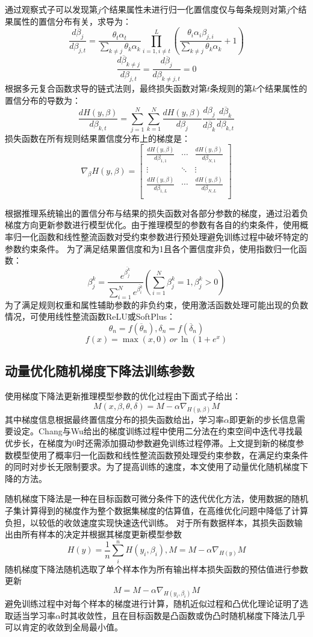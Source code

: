 \documentclass{cjc}
\begin{document}
通过观察式子可以发现第$j$个结果属性未进行归一化置信度仅与每条规则对第$j$个结果属性的置信分布有关，求导为：
$$\frac{d\overline{\beta}_j}{d\beta_{j,t}}=\frac{\theta_t\alpha_t}{\sum_{k\neq j}\theta_k\alpha_k}\prod_{i=1,i\neq t}^L(\frac{\theta_i\alpha_i\beta_{j,i}}{\sum_{k\neq j}\theta_k\alpha_k}+1)$$
$$\frac{d\overline{\beta}_{k\neq j}}{d\beta_{j,t}}=\frac{d\overline{\beta}_j}{d\beta_{k\neq j,t}}=0$$
根据多元复合函数求导的链式法则，最终损失函数对第$t$条规则的第$k$个结果属性的置信分布的导数为：
$$\frac{dH(y,\beta)}{d\beta_{k,t}}=\sum_{j=1}^N\sum_{k=1}^N\frac{dH(y,\beta)}{d\beta_j}\frac{d\beta_j}{d\overline{\beta}_k}\frac{d\overline{\beta}_k}{d\beta_{k,t}}$$
损失函数在所有规则结果置信度分布上的梯度是：
$$\nabla_{\beta}H(y,\beta)=
\left[
\begin{matrix}
\frac{dH(y,\beta)}{d\beta_{1,1}} & \cdots & 
\frac{dH(y,\beta)}{d\beta_{N,1}}\\
\vdots & \ddots & \vdots\\
\frac{dH(y,\beta)}{d\beta_{1,L}} & \cdots & 
\frac{dH(y,\beta)}{d\beta_{N,L}}\\
\end{matrix}
\right]$$

根据推理系统输出的置信分布与结果的损失函数对各部分参数的梯度，通过沿着负梯度方向更新参数进行模型优化。由于推理模型的参数有各自的约束条件，使用概率归一化函数和线性整流函数对受约束参数进行预处理避免训练过程中破坏特定的参数约束条件。  
为了满足结果置信度和为1且各个置信度非负，使用指数归一化函数：
$$\beta_j^k=\frac{e^{\overline{\beta_j^k}}}{\sum_{i=1}^Ne^{\overline{\beta_i^k}}}(\sum_{i=1}^N\beta_j^k=1,\beta_j^k>0)$$
为了满足规则权重和属性辅助参数的非负约束，使用激活函数处理可能出现的负数情况，可使用线性整流函数ReLU或SoftPlus：
$$\theta_n=f(\overline{\theta}_n),\delta_n=f(\overline{\delta}_n)$$
$$f(x)=\max(x,0)\,or\,\ln(1+e^x)$$
\subsection{动量优化随机梯度下降法训练参数}
使用梯度下降法更新推理模型参数的优化过程由下面式子给出：
$$M(x,\beta,\theta,\delta)=M-\alpha\nabla_{H(y,\beta)}M$$
其中梯度信息根据最终置信度分布的损失函数给出，学习率$\alpha$即更新的步长信息需要设定。Chang\cite{a10}与Wu\cite{a12}给出的梯度训练过程中使用二分法在约束空间中迭代寻找最优步长，在梯度为0时还需添加摄动参数避免训练过程停滞。上文提到新的梯度参数模型使用了概率归一化函数和线性整流函数预处理受约束参数，在满足约束条件的同时对步长无限制要求。为了提高训练的速度，本文使用了动量优化随机梯度下降的方法。

随机梯度下降法\cite{a17}是一种在目标函数可微分条件下的迭代优化方法，使用数据的随机子集计算得到的梯度作为整个数据集梯度的估算值，在高维优化问题中降低了计算负担，以较低的收敛速度实现快速迭代训练。  
对于所有数据样本，其损失函数输出由所有样本的决定并根据其梯度更新模型参数
$$H(y)=\frac{1}{n}\sum_i^nH(y_i,\beta_i),M=M-\alpha\nabla_{H(y)}M$$
随机梯度下降法随机选取了单个样本作为所有输出样本损失函数的预估值进行参数更新
$$M=M-\alpha\nabla_{H(y_i,\beta_i)}M$$
避免训练过程中对每个样本的梯度进行计算，随机近似过程和凸优化理论\cite{a18}证明了选取适当学习率$\alpha$时其收敛性，且在目标函数是凸函数或伪凸时随机梯度下降法几乎可以肯定的收敛到全局最小值。
\end{document}
